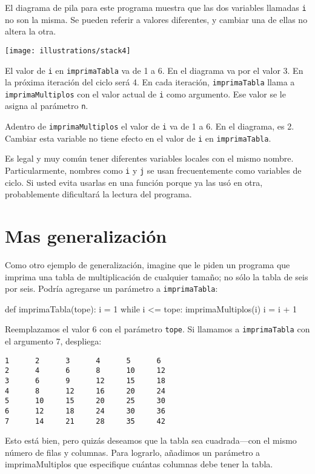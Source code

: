 El diagrama de pila para este programa muestra que las dos variables
llamadas \texttt{i} no son la misma. Se pueden referir a valores diferentes,
y cambiar una de ellas no altera la otra.

\beforefig \centerline{\texttt{[image: illustrations/stack4]}}
\afterfig

El valor de \texttt{i} en \texttt{imprimaTabla} va de 1 a 6. En el
diagrama va por el valor 3. En la próxima iteración del ciclo será
4. En cada iteración, \texttt{imprimaTabla} llama a \texttt{imprimaMultiplos}
con el valor actual de \texttt{i} como argumento. Ese valor se le
asigna al parámetro \texttt{n}.

Adentro de \texttt{imprimaMultiplos} el valor de \texttt{i} va de
1 a 6. En el diagrama, es 2. Cambiar esta variable no tiene efecto
en el valor de \texttt{i} en \texttt{imprimaTabla}.

Es legal y muy común tener diferentes variables locales con el mismo
nombre. Particularmente, nombres como \texttt{i} y \texttt{j} se usan
frecuentemente como variables de ciclo. Si usted evita usarlas en
una función porque ya las usó en otra, probablemente dificultará la
lectura del programa.


\section{Mas generalización}

Como otro ejemplo de generalización, imagine que le piden un programa
que imprima una tabla de multiplicación de cualquier tamaño; no sólo
la tabla de seis por seis. Podría agregarse un parámetro a \texttt{imprimaTabla}:
\begin{pythoncode}
def imprimaTabla(tope):
  i = 1
  while i <= tope:
    imprimaMultiplos(i)
    i = i + 1
\end{pythoncode}

Reemplazamos el valor 6 con el parámetro \texttt{tope}. Si llamamos
a \texttt{imprimaTabla} con el argumento 7, despliega:
\begin{verbatim}
1      2      3      4      5      6
2      4      6      8      10     12
3      6      9      12     15     18
4      8      12     16     20     24
5      10     15     20     25     30
6      12     18     24     30     36
7      14     21     28     35     42
\end{verbatim}
Esto está bien, pero quizás deseamos que la tabla sea cuadrada—con
el mismo número de filas y columnas. Para lograrlo, añadimos un parámetro
a imprimaMultiplos que especifique cuántas columnas debe tener la
tabla.

